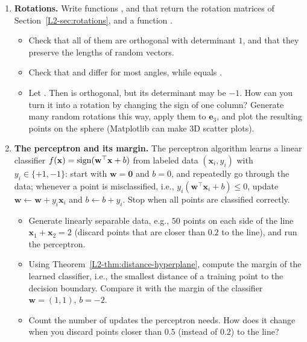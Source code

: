 \begin{enumerate}[label=\textbf{P\arabic*.}, leftmargin=*]
    \item \textbf{Rotations.} Write functions ,  and  that return the rotation matrices of Section~\ref{L2-sec:rotations}, and a function .
    \begin{itemize}
        \item Check that all of them are orthogonal with determinant $1$, and that they preserve the lengths of random vectors.
        \item Check that  and  differ for most angles, while  equals .
        \item Let . Then  is orthogonal, but its determinant may be $-1$. How can you turn it into a rotation by changing the sign of one column? Generate many random rotations this way, apply them to $\mathbf{e}_3$, and plot the resulting points on the sphere (Matplotlib can make 3D scatter plots).
    \end{itemize}

    \item \textbf{The perceptron and its margin.} The perceptron algorithm learns a linear classifier $f(\mathbf{x}) = \operatorname{sign}(\mathbf{w}^\top \mathbf{x} + b)$ from labeled data $(\mathbf{x}_i, y_i)$ with $y_i \in \{+1, -1\}$: start with $\mathbf{w} = \mathbf{0}$ and $b = 0$, and repeatedly go through the data; whenever a point is misclassified, i.e., $y_i (\mathbf{w}^\top \mathbf{x}_i + b) \leq 0$, update $\mathbf{w} \leftarrow \mathbf{w} + y_i \mathbf{x}_i$ and $b \leftarrow b + y_i$. Stop when all points are classified correctly.
    \begin{itemize}
        \item Generate linearly separable data, e.g., $50$ points on each side of the line $\mathbf{x}_1 + \mathbf{x}_2 = 2$ (discard points that are closer than $0.2$ to the line), and run the perceptron.
        \item Using Theorem~\ref{L2-thm:distance-hyperplane}, compute the margin of the learned classifier, i.e., the smallest distance of a training point to the decision boundary. Compare it with the margin of the classifier $\mathbf{w} = (1, 1)$, $b = -2$.
        \item Count the number of updates the perceptron needs. How does it change when you discard points closer than $0.5$ (instead of $0.2$) to the line?
    \end{itemize}


\end{enumerate}

